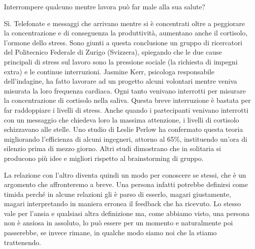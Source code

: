 \documentclass[12pt]{book} %
\begin{document}
\bigskip
\begin{mdframed}[linewidth=1pt]
Interrompere qualcuno mentre lavora può far male alla sua salute?

Sì. Telefonate e messaggi che arrivano mentre si è concentrati oltre a peggiorare la concentrazione e di conseguenza la
produttività, aumentano anche il cortisolo, l'ormone dello stress. Sono giunti a questa conclusione un gruppo di
ricercatori del Politecnico Federale di Zurigo (Svizzera), spiegando che le due cause principali di stress sul lavoro
sono la pressione sociale (la richiesta di impegni extra) e le continue interruzioni. Jasmine Kerr, psicologa
responsabile dell'indagine, ha fatto lavorare ad un progetto alcuni volontari mentre veniva misurata la loro frequenza
cardiaca. Ogni tanto venivano interrotti per misurare la concentrazione di cortisolo nella saliva. Questa breve
interruzione è bastata per far raddoppiare i livelli di stress. Anche quando i partecipanti venivano interrotti con un
messaggio che chiedeva loro la massima attenzione, i livelli di cortisolo schizzavano alle stelle. Uno studio di Leslie
Perlow ha confermato questa teoria migliorando l'efficienza di alcuni ingegneri, attorno al 65\%, instituendo
un'ora di silenzio prima di mezzo giorno. Altri studi dimostrano che in solitaria si producono più
idee e migliori rispetto al brainstorming di gruppo.
\end{mdframed}

\bigskip

La relazione con l'altro diventa quindi un modo per conoscere se stessi, che è un argomento che
affronteremo a breve. Una persona infatti potrebbe definirsi come timida perché in alcune relazioni gli è parso di
esserlo, magari giustamente, magari interpretando in maniera erronea il feedback che ha ricevuto. Lo stesso vale per
l'ansia e qualsiasi altra definizione ma, come abbiamo visto, una persona non è ansiosa in
assoluto, lo può essere per un momento e naturalmente poi passerebbe, se invece rimane, in qualche modo siamo noi che
la stiamo trattenendo.


\bigskip
\end{document}
